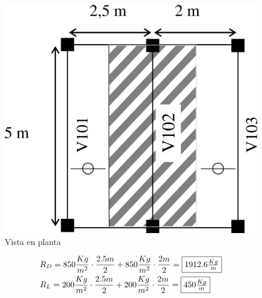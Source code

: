 \begin{enumerate}
\begin{figure}[H]
\begin{center}
     \includegraphics[scale = 0.9]{chapters/chapter_1/images/figura5.png}
     \caption{Vista en planta}
\end{center}
\end{figure}

\begin{align*}
& R_D=850 \frac{Kg}{m^2} \cdot \frac{2.5m}{2}+850 \frac{Kg}{m^2} \cdot \frac{2m}{2}=\framebox{$1912.6 \frac{Kg}{m}$}\\
& R_L=200 \frac{Kg}{m^2} \cdot \frac{2.5m}{2}+200 \frac{Kg}{m^2} \cdot \frac{2m}{2}=\framebox{$450 \frac{Kg}{m}$}
\end{align*}


\end{enumerate}
